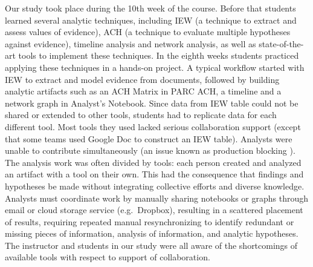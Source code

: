 Our study took place during the 10th week of the course. Before that
students learned several analytic techniques, including IEW (a technique
to extract and assess values of evidence), ACH (a technique to evaluate
multiple hypotheses against evidence), timeline analysis and network
analysis, as well as state-of-the-art tools to implement these
techniques. In the eighth weeks students practiced applying these
techniques in a hands-on project. A typical workflow started with IEW to
extract and model evidence from documents, followed by building analytic
artifacts such as an ACH Matrix in PARC ACH, a timeline and a network
graph in Analyst's Notebook. Since data from IEW table could not be
shared or extended to other tools, students had to replicate data for
each different tool. Most tools they used lacked serious collaboration
support (except that some teams used Google Doc to construct an IEW
table). Analysts were unable to contribute simultaneously (an issue
known as production blocking \autocite{Diehl1987a}). The analysis work
was often divided by tools: each person created and analyzed an artifact
with a tool on their own. This had the consequence that findings and
hypotheses be made without integrating collective efforts and diverse
knowledge. Analysts must coordinate work by manually sharing notebooks
or graphs through email or cloud storage service (e.g.~Dropbox),
resulting in a scattered placement of results, requiring repeated manual
resynchronizing to identify redundant or missing pieces of information,
analysis of information, and analytic hypotheses. The instructor and
students in our study were all aware of the shortcomings of available
tools with respect to support of collaboration.
